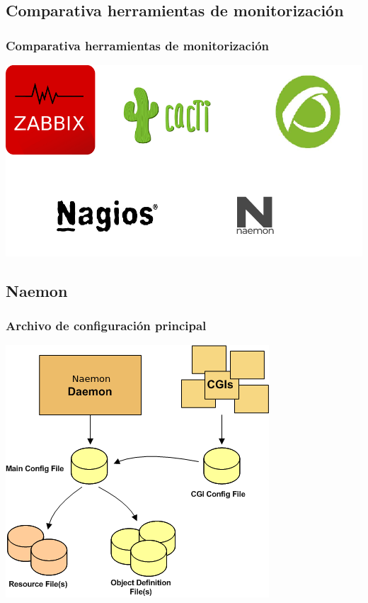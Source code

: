 \documentclass{beamer}
\theoremstyle{plain}
\theoremstyle{definition}
\theoremstyle{plain}
\theoremstyle{definition}
\theoremstyle{remark}
\theoremstyle{definition}
\begin{document}
\subsection{Comparativa herramientas de monitorización}
\begin{frame}
	\frametitle{Comparativa herramientas de monitorización}
	\centering
	\includegraphics[scale=0.5]{imagenes/comparativaMonitorizacion.png}
\end{frame}

\subsection{Naemon}
\begin{frame}
	\frametitle{Archivo de configuración principal}
	\centering
	\includegraphics[scale=0.5]{imagenes/main_configuring.png}
		
\end{frame}
\end{document}
